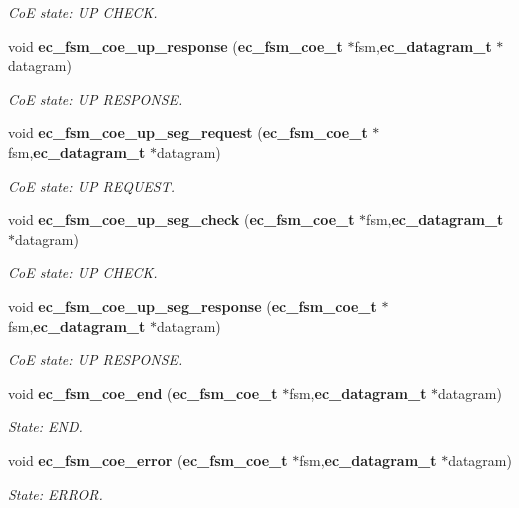 \begin{DoxyCompactItemize}
\begin{DoxyCompactList}\small\item\em \-Co\-E state\-: \-U\-P \-C\-H\-E\-C\-K. \end{DoxyCompactList}\item 
void {\bf ec\-\_\-fsm\-\_\-coe\-\_\-up\-\_\-response} ({\bf ec\-\_\-fsm\-\_\-coe\-\_\-t} $\ast$fsm,{\bf ec\-\_\-datagram\-\_\-t} $\ast$datagram)
\begin{DoxyCompactList}\small\item\em \-Co\-E state\-: \-U\-P \-R\-E\-S\-P\-O\-N\-S\-E. \end{DoxyCompactList}\item 
void {\bf ec\-\_\-fsm\-\_\-coe\-\_\-up\-\_\-seg\-\_\-request} ({\bf ec\-\_\-fsm\-\_\-coe\-\_\-t} $\ast$fsm,{\bf ec\-\_\-datagram\-\_\-t} $\ast$datagram)
\begin{DoxyCompactList}\small\item\em \-Co\-E state\-: \-U\-P \-R\-E\-Q\-U\-E\-S\-T. \end{DoxyCompactList}\item 
void {\bf ec\-\_\-fsm\-\_\-coe\-\_\-up\-\_\-seg\-\_\-check} ({\bf ec\-\_\-fsm\-\_\-coe\-\_\-t} $\ast$fsm,{\bf ec\-\_\-datagram\-\_\-t} $\ast$datagram)
\begin{DoxyCompactList}\small\item\em \-Co\-E state\-: \-U\-P \-C\-H\-E\-C\-K. \end{DoxyCompactList}\item 
void {\bf ec\-\_\-fsm\-\_\-coe\-\_\-up\-\_\-seg\-\_\-response} ({\bf ec\-\_\-fsm\-\_\-coe\-\_\-t} $\ast$fsm,{\bf ec\-\_\-datagram\-\_\-t} $\ast$datagram)
\begin{DoxyCompactList}\small\item\em \-Co\-E state\-: \-U\-P \-R\-E\-S\-P\-O\-N\-S\-E. \end{DoxyCompactList}\item 
void {\bf ec\-\_\-fsm\-\_\-coe\-\_\-end} ({\bf ec\-\_\-fsm\-\_\-coe\-\_\-t} $\ast$fsm,{\bf ec\-\_\-datagram\-\_\-t} $\ast$datagram)
\begin{DoxyCompactList}\small\item\em \-State\-: \-E\-N\-D. \end{DoxyCompactList}\item 
void {\bf ec\-\_\-fsm\-\_\-coe\-\_\-error} ({\bf ec\-\_\-fsm\-\_\-coe\-\_\-t} $\ast$fsm,{\bf ec\-\_\-datagram\-\_\-t} $\ast$datagram)
\begin{DoxyCompactList}\small\item\em \-State\-: \-E\-R\-R\-O\-R. \end{DoxyCompactList}\item 

\end{DoxyCompactItemize}
